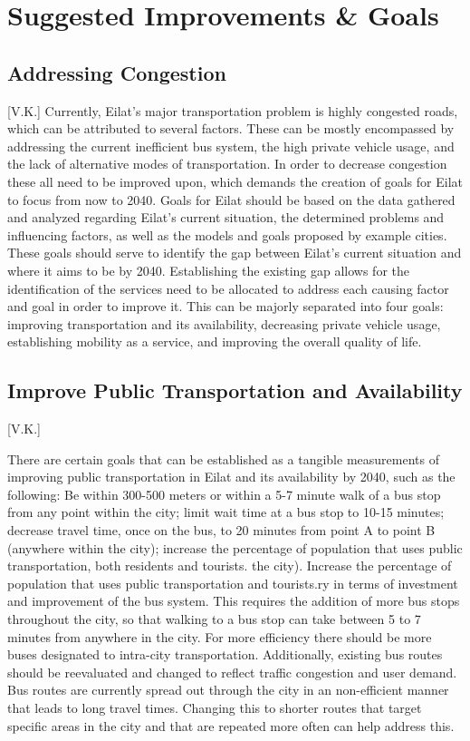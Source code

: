 \documentclass[12pt]{article}                       %
\begin{document}
\newpage
\section{Suggested Improvements \& Goals}
\subsection{Addressing Congestion}[V.K.]
Currently, Eilat's major transportation problem is highly congested roads, which can be attributed to several factors. These can be mostly encompassed by addressing the current inefficient bus system, the high private vehicle usage, and the lack of alternative modes of transportation. In order to decrease congestion these all need to be improved upon, which demands the creation of goals for Eilat to focus from now to 2040. Goals for Eilat should be based on the data gathered and analyzed regarding Eilat's current situation, the determined problems and influencing factors, as well as the models and goals proposed by example cities. These goals should serve to identify the gap between Eilat's current situation and where it aims to be by 2040. Establishing the existing gap allows for the identification of the services need to be allocated to address each causing factor and goal in order to improve it. This can be majorly separated into four goals: improving transportation and its availability, decreasing private vehicle usage,  establishing mobility as a service, and improving the overall quality of life. 

\subsection{Improve Public Transportation and Availability}[V.K.]

There are certain goals that can be established as a tangible measurements of improving public transportation in Eilat and its availability by 2040, such as the following: Be within 300-500 meters or within a 5-7 minute walk of a bus stop from any point within the city; limit wait time at a bus stop to 10-15 minutes; decrease travel time, once on the bus, to 20 minutes from point A to point B (anywhere within the city); increase the percentage of population that uses public transportation, both residents and tourists.
 the city).
Increase the percentage of population that uses public transportation and tourists.ry in terms of investment and improvement of the bus system. This requires the addition of more bus stops throughout the city, so that walking to a bus stop can take between 5 to 7 minutes from anywhere in the city. For more efficiency there should be more buses designated to intra-city transportation. Additionally, existing bus routes should be reevaluated and changed to reflect traffic congestion and user demand. Bus routes are currently spread out through the city in an non-efficient manner that leads to long travel times. Changing this to shorter routes that target specific areas in the city and that are repeated more often can help address this.
\end{document}
